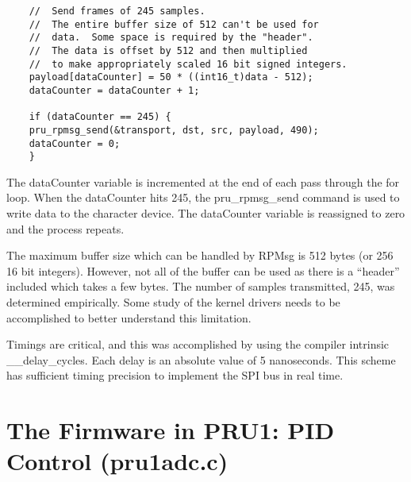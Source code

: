 \begin{verbatim}
    //  Send frames of 245 samples.
    //  The entire buffer size of 512 can't be used for
    //  data.  Some space is required by the "header".
    //  The data is offset by 512 and then multiplied
    //  to make appropriately scaled 16 bit signed integers.
    payload[dataCounter] = 50 * ((int16_t)data - 512);
    dataCounter = dataCounter + 1;
    
    if (dataCounter == 245) {
    pru_rpmsg_send(&transport, dst, src, payload, 490);
    dataCounter = 0;
    }
\end{verbatim}

The dataCounter variable is incremented at the end of each pass through the for loop.  When the dataCounter hits 245, the pru\_rpmsg\_send command is used to write data to the character device. The dataCounter variable is reassigned to zero and the process repeats.

The maximum buffer size which can be handled by RPMsg is 512 bytes (or 256 16 bit integers).  However, not all of the buffer can be used as there is a ``header'' included which takes a few bytes.  The number of samples transmitted, 245, was determined empirically.  Some study of the kernel drivers needs to be accomplished to better understand this limitation.

Timings are critical, and this was accomplished by using the compiler intrinsic \_\_delay\_cycles.  Each delay is an absolute value of 5 nanoseconds.  This scheme has sufficient timing precision to implement the SPI bus in real time.  

\section{The Firmware in PRU1: PID Control (pru1adc.c)}



